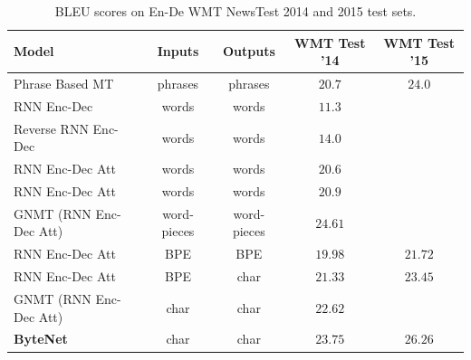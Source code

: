 \documentclass{article}
\begin{document}
\begin{table}[t]
\small
  \begin{center}
  \begin{tabular}{lcccc}
    \toprule
    \textbf{Model}  & \textbf{Inputs} & \textbf{Outputs} & \textbf{WMT Test '14} & \textbf{WMT Test '15} \\ \midrule
      Phrase Based MT \citep{freitag14:wmtEuBridge, DBLP:conf/wmt/WilliamsSNHK15} & phrases & phrases & ${20.7}$ & $24.0$ \\ \midrule
      RNN Enc-Dec \citep{luong-pham-manning:2015:EMNLP} & words & words & $11.3$   \\
      Reverse RNN Enc-Dec \citep{luong-pham-manning:2015:EMNLP} & words & words & $14.0$   \\
      RNN Enc-Dec Att \cite{zhou2016deep} & words & words & $20.6$ \\
      RNN Enc-Dec Att \citep{luong-pham-manning:2015:EMNLP} & words & words & ${20.9}$ \\
        GNMT   (RNN Enc-Dec Att) \citep{wu2016} & word-pieces & word-pieces &  $\mathbf{24.61}$ &  \\ \midrule
      RNN Enc-Dec Att \citep{DBLP:conf/acl/ChungCB16} & BPE & BPE & ${19.98}$ & ${21.72}$ \\

      RNN Enc-Dec Att \citep{DBLP:conf/acl/ChungCB16}  & BPE & char & ${21.33}$ & ${23.45}$ \\
      GNMT (RNN Enc-Dec Att) \citep{wu2016} & char & char & $22.62$ \\

      \textbf{ByteNet} & char & char &  $\mathbf{23.75}$ & $\mathbf{26.26}$ \\ 

      \bottomrule
  \end{tabular}
  \end{center}
\caption{BLEU scores on En-De WMT NewsTest 2014 and 2015 test sets.}
\label{mt}
\end{table}
\end{document}

